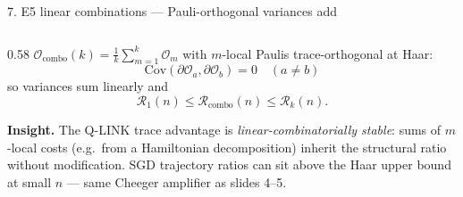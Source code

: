 \documentclass[10pt, aspectratio=169]{beamer}
\newcommand{\insight}[1]{\textbf{\textcolor{ours}{Insight.}} #1}
\begin{document}
\begin{frame}{7. E5 linear combinations — Pauli-orthogonal variances add}
    \begin{columns}
        \begin{column}{0.58\textwidth}\scriptsize
            $\mathcal{O}_{\mathrm{combo}}(k) = \tfrac{1}{k}\sum_{m=1}^k \mathcal{O}_m$ with $m$-local Paulis trace-orthogonal at Haar:
            \[
                \mathrm{Cov}(\partial \mathcal{O}_a, \partial \mathcal{O}_b) = 0 \quad (a \ne b)
            \]
            so variances sum linearly and
            \[
                \mathcal{R}_1(n) \le \mathcal{R}_{\mathrm{combo}}(n) \le \mathcal{R}_k(n).
            \]

            \vspace{0.4em}
            \insight{The Q-LINK trace advantage is \emph{linear-combinatorially stable}:
            sums of $m$-local costs (e.g.\ from a Hamiltonian decomposition) inherit the
            structural ratio without modification. SGD trajectory ratios can sit above the
            Haar upper bound at small $n$ — same Cheeger amplifier as slides 4–5.}


\end{column}
\end{columns}
\end{frame}
\end{document}

